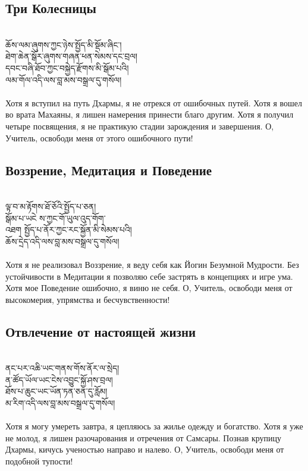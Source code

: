 \subsection*{Три Колесницы}
\\
\ti
ཆོས་ལམ་ཞུགས་ཀྱང་ཉེས་སྤྱོད་མི་སྡོམ་ཞིང་།\\
ཐེག་ཆེན་སྒོར་ཞུགས་གཞན་ཕན་སེམས་དང་བྲལ།\\
དབང་བཞི་ཐོབ་ཀྱང་བསྐྱེད་རྫོགས་མི་སྒོམ་པའི།\\
ལམ་གོལ་འདི་ལས་བླ་མས་བསྒྲལ་དུ་གསོལ།\\
\\
\ru
Хотя я вступил на путь Дхармы, я не отрекся от ошибочных путей.
Хотя я вошел во врата Махаяны, я лишен намерения принести благо другим.
Хотя я получил четыре посвящения, я не практикую стадии зарождения и завершения.
О, Учитель, освободи меня от этого ошибочного пути!

\subsection*{Воззрение, Медитация и Поведение}
\\
\ti
ལྟ་བ་མ་རྟོགས་ཐོ་ཅོའི་སྤྱོད་པ་ཅན།\\
སྒོམ་པ་ཡངེ ས་ཀྱང་གོ་ཡུལ་འུད་གོག་\\
འཐག སྤྱོད་པ་ནོར་ཀྱང་རང་སྐྱོན་མི་སེམས་པའི། \\
ཆོས་དྲེད་འདི་ལས་བླ་མས་བསྒྲལ་དུ་གསོལ།\\
\\
\ru
Хотя я не реализовал Воззрение, я веду себя как Йогин Безумной Мудрости.
Без устойчивости в Медитации я позволяю себе застрять в концепциях и игре ума.
Хотя мое Поведение ошибочно, я виню не себя.
О, Учитель, освободи меня от высокомерия, упрямства и бесчувственности!

\newpage
\subsection*{Отвлечение от настоящей жизни}
\\
\ti
ནང་པར་འཆི་ཡང་གནས་གོས་ནོར་ལ་སྲེད།\\
ན་ཚོད་ཡོལ་ཡང་ངེས་འབྱུང་སྐྱོ་ཤས་བྲལ། \\
ཐོས་པ་ཆུང་ཡང་ཡོན་ཏན་ཅན་དུ་རློམ། \\
མ་རིག་འདི་ལས་བླ་མས་བསྒྲལ་དུ་གསོལ།\\
\\
\ru
Хотя я могу умереть завтра, я цепляюсь за жилье одежду и богатство.
Хотя я уже не молод, я лишен разочарования и отречения от Самсары.
Познав крупицу Дхармы, кичусь ученостью направо и налево.
О, Учитель, освободи меня от подобной тупости!

